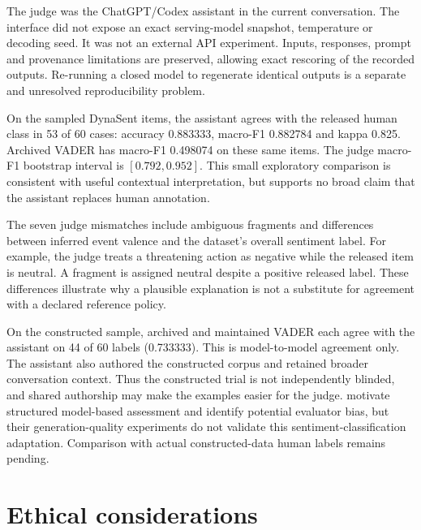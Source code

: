 \documentclass[11pt]{article}
\begin{document}
The judge was the ChatGPT/Codex assistant in the current conversation. The
interface did not expose an exact serving-model snapshot, temperature or decoding
seed. It was not an external API experiment. Inputs, responses, prompt and
provenance limitations are preserved, allowing exact rescoring of the recorded
outputs. Re-running a closed model to regenerate identical outputs is a separate
and unresolved reproducibility problem.

\begin{table}[t]
\centering\small
\caption{Exploratory comparison on the same balanced 60-item DynaSent sample.
The assistant result comes from preserved within-session textual judgements.}
\label{tab:judge}
\end{table}

On the sampled DynaSent items, the assistant agrees with the released human class
in 53 of 60 cases: accuracy 0.883333, macro-F1 0.882784 and kappa 0.825.
Archived VADER has macro-F1 0.498074 on these same items. The judge macro-F1
bootstrap interval is $[0.792,0.952]$. This small exploratory comparison is
consistent with useful contextual interpretation, but supports no broad claim
that the assistant replaces human annotation.

The seven judge mismatches include ambiguous fragments and differences between
inferred event valence and the dataset's overall sentiment label. For example,
the judge treats a threatening action as negative while the released item is
neutral. A fragment is assigned neutral despite a positive released label.
These differences illustrate why a plausible explanation is not a substitute
for agreement with a declared reference policy.

On the constructed sample, archived and maintained VADER each agree with the
assistant on 44 of 60 labels (0.733333). This is model-to-model agreement only.
The assistant also authored the constructed corpus and retained broader
conversation context. Thus the constructed trial is not independently blinded,
and shared authorship may make the examples easier for the judge.
\citet{liu2023geval} motivate structured model-based assessment and identify
potential evaluator bias, but their generation-quality experiments do not validate
this sentiment-classification adaptation. Comparison with actual constructed-data
human labels remains pending.

\section{Ethical considerations}
\end{document}
